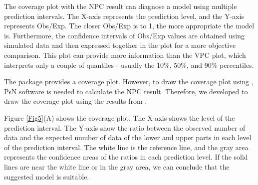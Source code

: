 The coverage plot with the NPC result can diagnose a model using multiple prediction intervals. The X-axis represents the prediction level, and the Y-axis represents Obs/Exp. The closer Obs/Exp is to 1, the more appropriate the model is. Furthermore, the confidence intervals of Obs/Exp values are obtained using simulated data and then expressed together in the plot for a more objective comparison. This plot can provide more information than the VPC plot, which interprets only a couple of quantiles - usually the 10\%, 50\%, and 90\% percentiles.

The  package \citep{keizer2013modeling} provides a coverage plot. However,
to draw the coverage plot using , PsN \citep{lindbom2004perl} software is needed to calculate  the NPC result. Therefore, we developed  to draw the coverage plot using the results from .

Figure \ref{Fig5}(A) shows the coverage plot. The X-axis shows the level of the prediction interval. The Y-axis show the ratio between the observed number of data and the expected number of data of the lower and upper parts in each level of the prediction interval. The white line is the reference line, and the gray area represents the confidence areas of the ratios in each prediction level. If the solid lines are near the white line or in the gray area, we can conclude that the suggested model is suitable.


